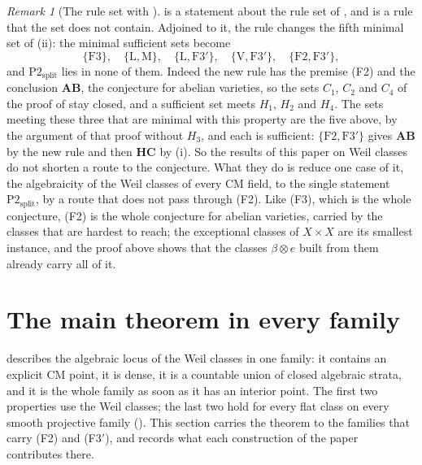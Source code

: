 \documentclass[11pt,reqno]{amsart}
\theoremstyle{plain}
\theoremstyle{definition}
\theoremstyle{remark}
\newtheorem{remark}[theorem]{Remark}
\begin{document}
\begin{remark}[The rule set with ]\label{rem:f2rule}
 is a statement about the rule set of ,
and  is a rule that the set does not contain. Adjoined to
it, the rule changes the fifth minimal set of (ii): the
minimal sufficient sets become
\[
  \{\mathrm{F3}\},\quad\{\mathrm{L},\mathrm{M}\},\quad
  \{\mathrm{L},\mathrm{F3}'\},\quad\{\mathrm{V},\mathrm{F3}'\},\quad
  \{\mathrm{F2},\mathrm{F3}'\},
\]
and $\mathrm{P2}_{\mathrm{split}}$ lies in none of them. Indeed the new rule
has the premise (F2) and the conclusion $\mathbf{AB}$, the conjecture for
abelian varieties, so the sets $C_{1}$, $C_{2}$ and $C_{4}$ of the proof of
 stay closed, and a sufficient set meets $H_{1}$, $H_{2}$
and $H_{4}$. The sets meeting these three that are minimal with this property
are the five above, by the argument of that proof without $H_{3}$, and each is
sufficient: $\{\mathrm{F2},\mathrm{F3}'\}$ gives $\mathbf{AB}$ by the new
rule and then $\mathbf{HC}$ by (i). So the results of this
paper on Weil classes do not shorten a route to the conjecture. What they do
is reduce one case of it, the algebraicity of the Weil classes of every CM
field, to the single statement $\mathrm{P2}_{\mathrm{split}}$, by a route that
does not pass through (F2). Like (F3), which is the whole conjecture, (F2) is
the whole conjecture for abelian varieties, carried by the classes that are
hardest to reach; the exceptional classes of $X\times X$ are its smallest
instance, and the proof above shows that the classes $\beta\otimes e$ built
from them already carry all of it.
\end{remark}
\section{The main theorem in every family}\label{sec:families}

\cite[Theorem~1.1]{paperI} describes the algebraic locus of the Weil classes in one
family: it contains an explicit CM point, it is dense, it is a countable union
of closed algebraic strata, and it is the whole family as soon as it has an
interior point. The first two properties use the Weil classes; the last two
hold for every flat class on every smooth projective family
(). This section carries the theorem to the families that
carry (F2) and
\textup{(F3$'$)}, and records what each construction of the paper
contributes there.
\end{document}
